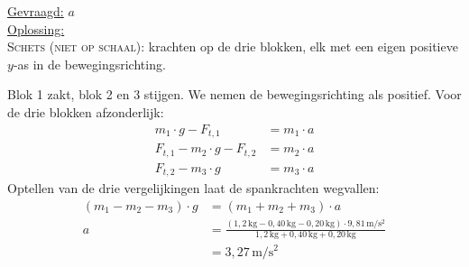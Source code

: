\documentclass{ximera}
\newcommand{\blokje}[4][left]{\fill (#2,#3) circle (0.05); \node[#1, inner sep=3pt] at (#2,#3) {#4};}
\newcommand{\kr}[7][kracht]{\draw[#1] (#2,#3) -- ++(#4,#5) node[#6] {#7};}
\newcommand{\as}[6]{\draw[positie] (#1,#2) -- ++(#3,#4) node[#5] {#6};}
\begin{document}
\begin{exercise}
\begin{question}
\begin{solution}
            \underline{Gevraagd:} $a$ \\

            \underline{Oplossing:}\\
            \textsc{Schets (niet op schaal):} krachten op de drie blokken, elk met een eigen positieve $y$-as in de bewegingsrichting.

            \begin{center}
            \end{center}

            Blok 1 zakt, blok 2 en 3 stijgen. We nemen de bewegingsrichting als positief. Voor de drie blokken afzonderlijk:
            \begin{align*}
                m_{1} \cdot g - F_{t,1} &= m_{1} \cdot a \\
                F_{t,1} - m_{2} \cdot g - F_{t,2} &= m_{2} \cdot a \\
                F_{t,2} - m_{3} \cdot g &= m_{3} \cdot a
            \end{align*}
            Optellen van de drie vergelijkingen laat de spankrachten wegvallen:
            \begin{align*}
                (m_{1} - m_{2} - m_{3}) \cdot g &= (m_{1}+m_{2}+m_{3}) \cdot a \\
                a &= \frac{(1{,}2 \, \mathrm{kg} - 0{,}40 \, \mathrm{kg} - 0{,}20 \, \mathrm{kg}) \cdot 9{,}81 \, \mathrm{m/s^2}}{1{,}2 \, \mathrm{kg} + 0{,}40 \, \mathrm{kg} + 0{,}20 \, \mathrm{kg}} \\
                &= 3{,}27 \, \mathrm{m/s^2}
            \end{align*}
        \end{solution}
    \end{question}


\end{exercise}
\end{document}
